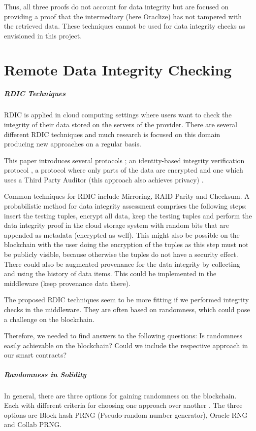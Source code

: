 Thus, all three proofs do not account for data integrity but are focused on providing a proof that the intermediary (here Oraclize) has not tampered with the retrieved data. These techniques cannot be used for data integrity checks as envisioned in this project.

\section{Remote Data Integrity Checking}

\subparagraph{RDIC Techniques}
RDIC is applied in cloud computing settings where users want to check the integrity of their data stored on the servers of the provider.
There are several different RDIC techniques \cite{relatedWork16} and much research is focused on this domain producing new approaches on a regular basis.

This paper introduces several protocols \cite{relatedWork17}; an identity-based integrity verification protocol \cite{relatedWork18}, a protocol where only parts of the data are encrypted \cite{relatedWork19} and one which uses a Third Party Auditor (this approach also achieves privacy) \cite{relatedWork20}.

Common techniques for RDIC include Mirroring, RAID Parity and Checksum. A probabilistic method for data integrity assessment comprises the following steps: insert the testing tuples, encrypt all data, keep the testing tuples and perform the data integrity proof in the cloud storage system with random bits that are appended as metadata (encrypted as well).
This might also be possible on the blockchain with the user doing the encryption of the tuples as this step must not be publicly visible, because otherwise the tuples do not have a security effect. There could also be augmented provenance for the data integrity by collecting and using the history of data items. This could be implemented in the middleware (keep provenance data there). \cite{relatedWork21}

The proposed RDIC techniques seem to be more fitting if we performed integrity checks in the middleware. They are often based on randomness, which could pose a challenge on the blockchain.

Therefore, we needed to find answers to the following questions: Is randomness easily achievable on the blockchain? Could we include the respective approach in our smart contracts?

\subparagraph{Randomness in Solidity}
In general, there are three options for gaining randomness on the blockchain. Each with different criteria for choosing one approach over another \cite{relatedWork22}. The three options are Block hash PRNG (Pseudo-random number generator), Oracle RNG and Collab PRNG.

